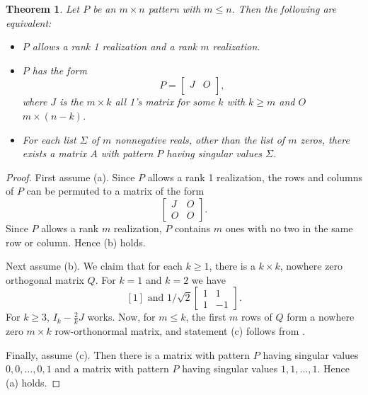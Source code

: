 \documentclass[preprint,12pt]{elsarticle}
\newtheorem{theorem}{Theorem}[section]
\begin{document}
\begin{theorem}
    Let $P$ be an $m \times n $ pattern with $m \leq n$. Then the following are equivalent:
    \begin{itemize}
        \item[\rm (a)] $P$ allows a rank 1 realization and a rank $m$ realization.  
        \item[\rm (b)] $P$ has the form
        \[ P = 
        \left[ 
        \begin{array}{r|r}
             J & O  \\
        \end{array}
        \right],
        \]
        where $J$ is the $m \times k$ all 1's matrix for some $k$ with  $k \geq m$ and $O$ $m \times (n-k)$.
        \item[\rm (c)] For each list $\Sigma$ of  $m$ nonnegative reals, other than the list of $m$ zeros, there exists a matrix $A$ with pattern $P$ 
        having singular values $\Sigma$. 
    \end{itemize}
\end{theorem}

\begin{proof}
First assume (a).  Since $P$ allows a rank 1 realization, 
the rows and columns of $P$ can be permuted to a matrix of the form 
\[
\left[ 
\begin{array}{c|c}
J & O \\ \hline
O & O 
\end{array} \right].
\]
Since $P$ allows a rank $m$ realization, $P$ contains $m$ 
ones with no two in the same row or column.  Hence (b) holds.

Next assume (b). 
We claim that for each $k\geq 1$, there is a $k\times k$, nowhere zero 
orthogonal matrix $Q$.  For $k=1$ and $k=2$ we have
\[
[1] \mbox{ and } {1/\sqrt{2}}\left[ \begin{array}{rr}
1 & 1 \\
1 & -1
\end{array} \right]. 
\]
For $k\geq 3$, $I_{k}- \frac{2}{k}J$ works. Now, for $m\leq k$, the first $m$ rows of $Q$ form a nowhere zero $m\times k$ row-orthonormal matrix, and 
statement (c) follows from .

Finally, assume (c). 
Then there is a matrix with pattern $P$ having 
singular values $0,0,\ldots, 0, 1$ and a matrix with pattern $P$ having singular values $1,1, \ldots, 1$.
Hence (a) holds. 
\end{proof}
\end{document}

